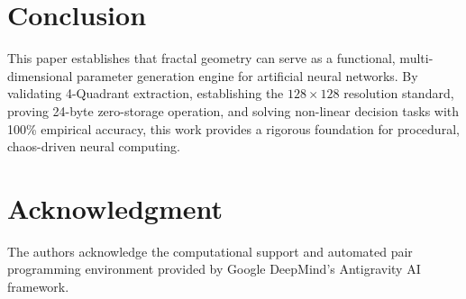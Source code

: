 \documentclass[10pt,journal,compsoc,twocolumn]{article}
\begin{document}
\section{Conclusion}
This paper establishes that fractal geometry can serve as a functional, multi-dimensional parameter generation engine for artificial neural networks. By validating 4-Quadrant extraction, establishing the $128 \times 128$ resolution standard, proving 24-byte zero-storage operation, and solving non-linear decision tasks with 100\% empirical accuracy, this work provides a rigorous foundation for procedural, chaos-driven neural computing.

\section*{Acknowledgment}
The authors acknowledge the computational support and automated pair programming environment provided by Google DeepMind's Antigravity AI framework.



\end{document}
